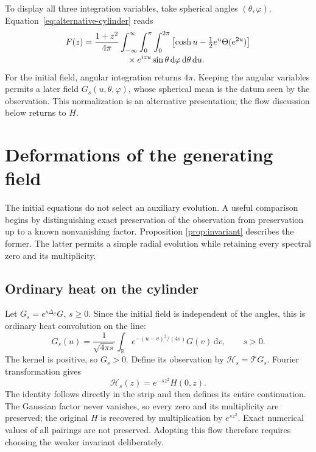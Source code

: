 \documentclass[11pt]{article}
\theoremstyle{remark}
\numberwithin{equation}{section}
\newcommand{\R}{\mathbb R}
\newcommand{\cC}{\mathcal C}
\newcommand{\dd}{\,\mathrm d}
\begin{document}
To display all three integration variables, take spherical angles
\((\theta,\varphi)\). Equation~\eqref{eq:alternative-cylinder} reads
\begin{equation}\label{eq:triple}
 \begin{split}
 F(z)=\frac{1+z^2}{4\pi}
 \int_{-\infty}^\infty\int_0^\pi\int_0^{2\pi}
 &\left[\cosh u-\tfrac12e^u\Theta(e^{2u})\right]\\[-2pt]
 &\hspace{-18mm}\times e^{izu}\sin\theta\dd\varphi\dd\theta\dd u.
 \end{split}
\end{equation}
For the initial field, angular integration returns \(4\pi\).
Keeping the angular variables permits a later field
\(G_s(u,\theta,\varphi)\), whose spherical mean is the datum seen
by the observation. This normalization is an alternative presentation;
the flow discussion below returns to \(H\).

\section{Deformations of the generating field}
\label{sec:flows}

The initial equations do not select an auxiliary evolution. A useful
comparison begins by distinguishing exact preservation of the observation
from preservation up to a known nonvanishing factor. Proposition
\ref{prop:invariant} describes the former. The latter permits a simple
radial evolution while retaining every spectral zero and its multiplicity.

\subsection{Ordinary heat on the cylinder}

Let \(G_s=e^{s\Delta_{\cC}}G\), \(s\ge0\). Since the initial field
is independent of the angles, this is ordinary heat convolution on the
line:
\begin{equation}\label{eq:cylinderheat}
 G_s(u)=\frac1{\sqrt{4\pi s}}\int_{\R}
 e^{-(u-v)^2/(4s)}G(v)\dd v,\qquad s>0.
\end{equation}
The kernel is positive, so \(G_s>0\). Define its observation by
\(\mathscr H_s=\mathcal TG_s\). Fourier transformation gives
\begin{equation}\label{eq:heat-observation}
 \boxed{\mathscr H_s(z)=e^{-sz^2}H(0,z).}
\end{equation}
The identity follows directly in the strip and then defines its entire
continuation. The Gaussian factor never vanishes, so every zero and its
multiplicity are preserved; the original \(H\) is recovered by
multiplication by \(e^{sz^2}\). Exact numerical values of all pairings
are not preserved. Adopting this flow therefore requires choosing the
weaker invariant deliberately.
\end{document}
